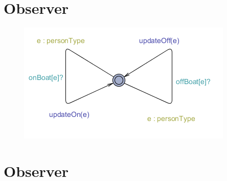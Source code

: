 \section{Observer}
\begin{figure}%
\includegraphics[width=\columnwidth]{pictures/observer.png}%
\caption{}%
\label{}%
\end{figure}




























\section{Observer}